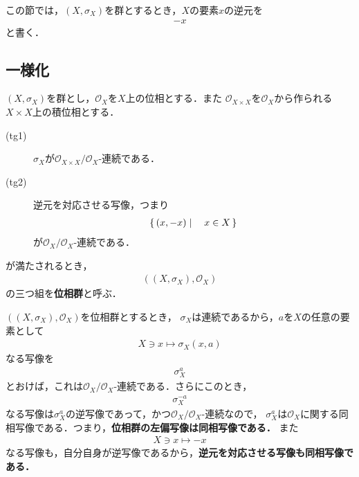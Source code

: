 	この節では，$\left(X,\sigma_X\right)$を群とするとき，$X$の要素$x$の逆元を
	\begin{align}
		-x
	\end{align}
	と書く．
	
\subsection{一様化}
	\begin{screen}
		\begin{dfn}[位相群]\label{def:topological_group}
			$\left(X,\sigma_X\right)$を群とし，$\mathscr{O}_X$を$X$上の位相とする．また
			$\mathscr{O}_{X \times X}$を$\mathscr{O}_X$から作られる$X \times X$上の積位相とする．
			\begin{description}
				\item[(tg1)] $\sigma_X$が$\mathscr{O}_{X \times X}/\mathscr{O}_X$-連続である．
				\item[(tg2)] 逆元を対応させる写像，つまり
					\begin{align}
						\left\{\, (x,-x) \mid \quad x \in X\, \right\}
					\end{align}
					が$\mathscr{O}_X/\mathscr{O}_X$-連続である．
			\end{description}
			が満たされるとき，
			\begin{align}
				\left(\left(X,\sigma_X\right),\mathscr{O}_X\right)
				\label{pair_topological_group}
			\end{align}
			の三つ組を{\bf 位相群}と呼ぶ．
		\end{dfn}
	\end{screen}
	
	$\left(\left(X,\sigma_X\right),\mathscr{O}_X\right)$を位相群とするとき，
	$\sigma_X$は連続であるから，$a$を$X$の任意の要素として
	\begin{align}
		X \ni x \longmapsto \sigma_X(x,a)
	\end{align}
	なる写像を
	\begin{align}
		\sigma_X^a
	\end{align}
	とおけば，これは$\mathscr{O}_X/\mathscr{O}_X$-連続である．さらにこのとき，
	\begin{align}
		\sigma_X^{-a}
	\end{align}
	なる写像は$\sigma_X^a$の逆写像であって，かつ$\mathscr{O}_X/\mathscr{O}_X$-連続なので，
	$\sigma_X^a$は$\mathscr{O}_X$に関する同相写像である．つまり，{\bf 位相群の左偏写像は同相写像である．}
	また
	\begin{align}
		X \ni x \longmapsto -x
	\end{align}
	なる写像も，自分自身が逆写像であるから，{\bf 逆元を対応させる写像も同相写像である．}
	
